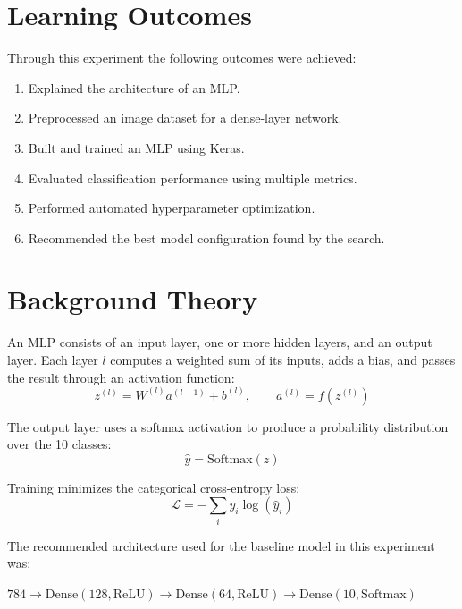 \documentclass[11pt]{article}
\begin{document}
\section{Learning Outcomes}
Through this experiment the following outcomes were achieved:
\begin{enumerate}[label=\arabic*.]
    \item Explained the architecture of an MLP.
    \item Preprocessed an image dataset for a dense-layer network.
    \item Built and trained an MLP using Keras.
    \item Evaluated classification performance using multiple metrics.
    \item Performed automated hyperparameter optimization.
    \item Recommended the best model configuration found by the search.
\end{enumerate}

\section{Background Theory}
An MLP consists of an input layer, one or more hidden layers, and an output layer.
Each layer $l$ computes a weighted sum of its inputs, adds a bias, and passes the
result through an activation function:
\begin{equation}
    z^{(l)} = W^{(l)} a^{(l-1)} + b^{(l)}, \qquad a^{(l)} = f\left(z^{(l)}\right)
\end{equation}

The output layer uses a softmax activation to produce a probability distribution
over the 10 classes:
\begin{equation}
    \hat{y} = \mathrm{Softmax}(z)
\end{equation}

Training minimizes the categorical cross-entropy loss:
\begin{equation}
    \mathcal{L} = -\sum_i y_i \log(\hat{y}_i)
\end{equation}

The recommended architecture used for the baseline model in this experiment was:
\begin{center}
    $784 \rightarrow \text{Dense}(128, \text{ReLU}) \rightarrow \text{Dense}(64, \text{ReLU}) \rightarrow \text{Dense}(10, \text{Softmax})$
\end{center}
\end{document}
